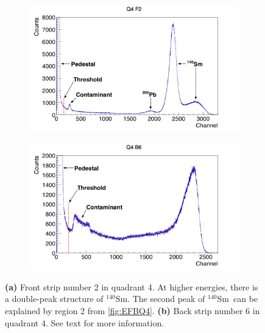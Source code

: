 \documentclass[twoside,english]{uiofysmaster/uiofysmaster}
\newcommand{\Sm}{$^{140}$Sm} %
\let\orgautoref\autoref
\renewcommand{\autoref}
        {%
		 \def\sectionautorefname{Section}%
		 \def\subsectionautorefname{Section}%
		 \def\subsubsectionautorefname{Section}%
		 \def\chapterautorefname{Chapter}%
          \orgautoref}
\begin{document}
\begin{figure}[htb]
	\centering
	\begin{subfigure}[t]{0.49\textwidth}
		\centering
		\includegraphics[width=\textwidth]{../Plots/plotting/Threshold_Q4_f2.png}
		\caption{}
		\label{fig:th_f}
	\end{subfigure}
	\hfill 
	\begin{subfigure}[t]{0.49\textwidth}
		\centering
    		\includegraphics[width=\textwidth]{../Plots/plotting/Threshold_Q4_b6.png}
		\caption{}
		\label{fig:th_b}
	\end{subfigure}
	\caption{\textbf{(a)} Front strip number 2 in quadrant 4. 
	At higher energies, there is a double-peak structure of \Sm. 
	The second peak of \Sm\ can be explained by region 2 from \autoref{fig:EFBQ4}.
	\textbf{(b)} Back strip number 6 in quadrant 4.
	See text for more information.}
	\label{fig:threshold}
\end{figure}
\end{document}

